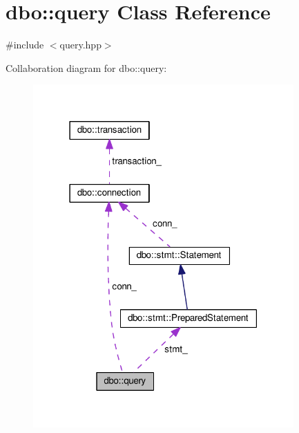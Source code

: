 \hypertarget{classdbo_1_1query}{\section{dbo\+:\+:query Class Reference}
\label{classdbo_1_1query}
}


{\ttfamily \#include $<$query.\+hpp$>$}



Collaboration diagram for dbo\+:\+:query\+:\nopagebreak
\begin{figure}[H]
\begin{center}
\leavevmode
\includegraphics[width=283pt]{classdbo_1_1query__coll__graph}
\end{center}
\end{figure}
